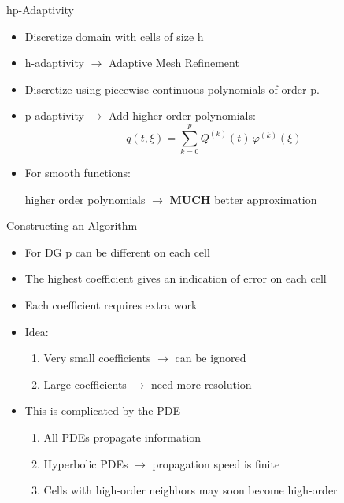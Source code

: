 \documentclass[sansserif]{beamer}
\begin{document}
\begin{frame}{hp-Adaptivity}
 \begin{itemize}
  \item<1-> Discretize domain with cells of size h
  \item<1-> h-adaptivity $\rightarrow$ Adaptive Mesh Refinement
  \item<2-> Discretize using piecewise continuous polynomials of order p.
  \item<2-> p-adaptivity $\rightarrow$ Add higher order polynomials:
  \[ q(t,\xi) = \sum_{k=0}^p Q^{(k)}(t) \, \varphi^{(k)}(\xi) \]
  \item<3-> {\color{red} For smooth functions:
  
  higher order polynomials $\rightarrow$ {\bf MUCH} better approximation}
 \end{itemize}
\end{frame}

\begin{frame}{Constructing an Algorithm}
\begin{itemize}
   \item<1-> For DG p can be different on each cell
  \item<2-> The highest coefficient gives an indication of error on each cell
    \item<2-> Each coefficient requires extra work
    \item<3-> {\color{red} Idea:}
    \begin{enumerate}
  \item Very small coefficients $\rightarrow$ can be ignored
  \item Large coefficients $\rightarrow$ need more resolution
  \end{enumerate}
  \item<4-> This is complicated by the PDE
  \begin{enumerate}
   \item All PDEs propagate information
   \item Hyperbolic PDEs $\rightarrow$ propagation speed is finite
   \item Cells with high-order neighbors may soon become high-order
  \end{enumerate}
\end{itemize}
\end{frame}
\end{document}
